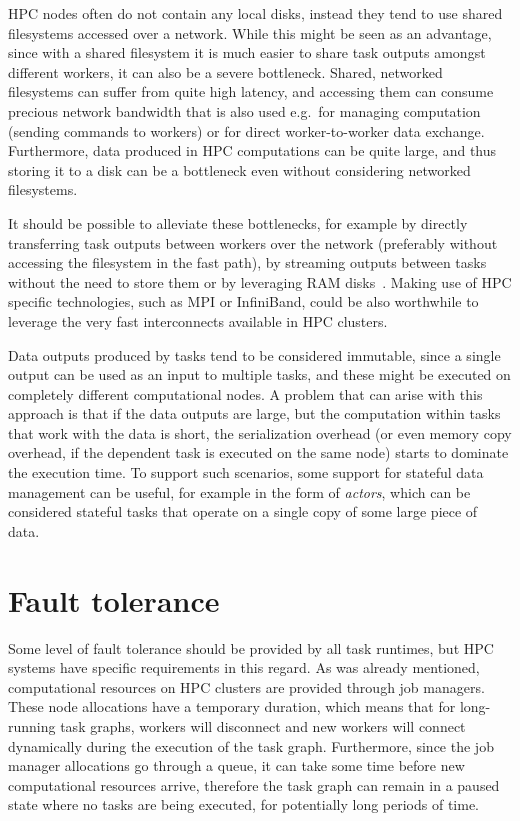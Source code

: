 HPC nodes often do not contain any local disks, instead they tend to use shared filesystems
accessed over a network. While this might be seen as an advantage, since with a shared filesystem
it is much easier to share task outputs amongst different workers, it can also be a severe
bottleneck. Shared, networked filesystems can suffer from quite high latency, and accessing them
can consume precious network bandwidth that is also used e.g.\ for managing computation (sending
commands to workers) or for direct worker-to-worker data exchange. Furthermore, data produced in
HPC computations can be quite large, and thus storing it to a disk can be a bottleneck even without
considering networked filesystems.

It should be possible to alleviate these bottlenecks, for example by directly transferring task
outputs between workers over the network (preferably without accessing the filesystem in the fast
path), by streaming outputs between tasks without the need to store them or by leveraging RAM
disks~\cite{hyperloom}. Making use of HPC specific technologies, such as MPI or
InfiniBand, could be also worthwhile to leverage the very fast interconnects available in HPC
clusters.

Data outputs produced by tasks tend to be considered immutable, since a single output can be used
as an input to multiple tasks, and these might be executed on completely different computational
nodes. A problem that can arise with this approach is that if the data outputs are large, but the
computation within tasks that work with the data is short, the serialization overhead (or even
memory copy overhead, if the dependent task is executed on the same node) starts to dominate the
execution time. To support such scenarios, some support for stateful data management can be useful,
for example in the form of \emph{actors}, which can be considered stateful tasks that
operate on a single copy of some large piece of data.

\section{Fault tolerance}
Some level of fault tolerance should be provided by all task runtimes, but HPC systems have
specific requirements in this regard. As was already mentioned, computational resources on HPC
clusters are provided through job managers. These node allocations have a temporary duration, which
means that for long-running task graphs, workers will disconnect and new workers will connect
dynamically during the execution of the task graph. Furthermore, since the job manager allocations
go through a queue, it can take some time before new computational resources arrive, therefore the
task graph can remain in a paused state where no tasks are being executed, for potentially long
periods of time.

